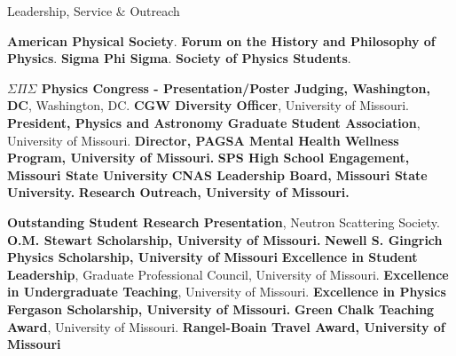 \begin{rubric}{Leadership, Service \& Outreach}

\entry*[2019--Present] \textbf{American Physical Society}.
\entry*[2020--Present] \textbf{Forum on the History and Philosophy of Physics}.
\entry*[2022--Present] \textbf{Sigma Phi Sigma}.
\entry*[2017--2021] \textbf{Society of Physics Students}.

\entry*[2022] \textbf{$\Sigma \Pi \Sigma$ Physics Congress - Presentation/Poster Judging, Washington, DC}, Washington, DC.
\entry*[2022--Present] \textbf{CGW Diversity Officer}, University of Missouri.
\entry*[2022--Present] \textbf{President, Physics and Astronomy Graduate Student Association}, University of Missouri.
\entry*[2022-2024] \textbf{Director, PAGSA Mental Health Wellness Program, University of Missouri.}
\entry*[2017-2020] \textbf{SPS High School Engagement, Missouri State University}
\entry*[2018-2019] \textbf{CNAS Leadership Board, Missouri State University.}
\entry*[2022-2024] \textbf{ Research Outreach, University of Missouri.}

\entry*[2023] \textbf{Outstanding Student Research Presentation}, Neutron Scattering Society.
\entry*[2021] \textbf{O.M. Stewart Scholarship, University of Missouri.}
\entry*[2022] \textbf{Newell S. Gingrich Physics Scholarship, University of Missouri}
\entry*[2022] \textbf{Excellence in Student Leadership}, Graduate Professional Council, University of Missouri.
\entry*[2022] \textbf{Excellence in Undergraduate Teaching}, University of Missouri.
\entry*[2023] \textbf{Excellence in Physics Fergason Scholarship, University of Missouri.}
\entry*[2023] \textbf{Green Chalk Teaching Award}, University of Missouri.
\entry*[2023] \textbf{Rangel-Boain Travel Award, University of Missouri}

\end{rubric}

